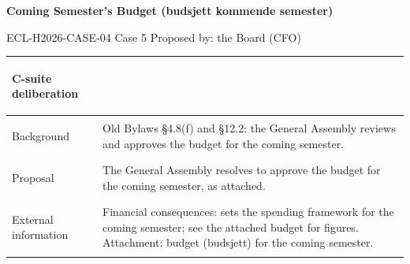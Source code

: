 \documentclass{../../../Common/Latex/Templates/rapport}
\begin{document}
\reportmainmatter
\small
\setlength{\parindent}{0pt}
\setlength{\tabcolsep}{6pt}
\renewcommand{\arraystretch}{1.2}

\begin{center}
  {\Large\bfseries Coming Semester's Budget (budsjett kommende semester)}\par
  \vspace{0.15cm}
  {\normalsize ECL-H2026-CASE-04 \textperiodcentered{} Case 5 \textperiodcentered{} Proposed by: the Board (CFO)}\par
  \vspace{0.1cm}
  {\small \meetingline}\par
\end{center}

\vspace{0.3cm}
\begin{tabularx}{\textwidth}{|>{\bfseries\raggedright\arraybackslash}p{4.2cm}|X|}
  \hline
  C-suite deliberation & \rule{0pt}{4.1cm} \\
  \hline
  Background           & Old Bylaws \S4.8(f) and \S12.2: the General Assembly reviews and approves the budget for the coming semester. \\
  \hline
  Proposal             & The General Assembly resolves to approve the budget for the coming semester, as attached. \\
  \hline
  External information & Financial consequences: sets the spending framework for the coming semester; see the attached budget for figures. Attachment: budget (budsjett) for the coming semester. \\
  \hline
\end{tabularx}
\end{document}
